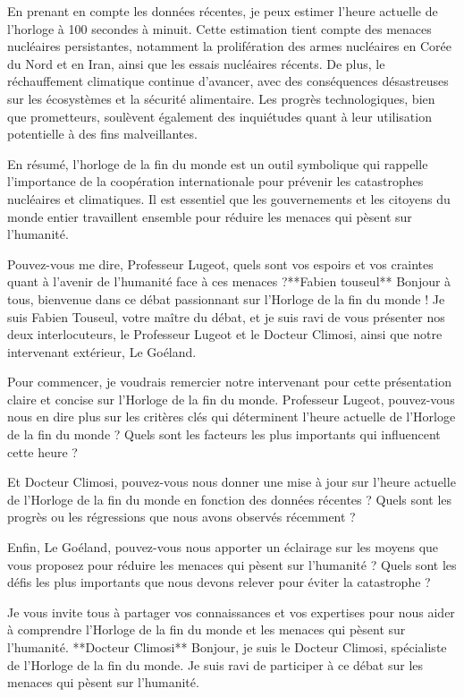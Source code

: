 En prenant en compte les données récentes, je peux estimer l'heure actuelle de l'horloge à 100 secondes à minuit. Cette estimation tient compte des menaces nucléaires persistantes, notamment la prolifération des armes nucléaires en Corée du Nord et en Iran, ainsi que les essais nucléaires récents. De plus, le réchauffement climatique continue d'avancer, avec des conséquences désastreuses sur les écosystèmes et la sécurité alimentaire. Les progrès technologiques, bien que prometteurs, soulèvent également des inquiétudes quant à leur utilisation potentielle à des fins malveillantes.

En résumé, l'horloge de la fin du monde est un outil symbolique qui rappelle l'importance de la coopération internationale pour prévenir les catastrophes nucléaires et climatiques. Il est essentiel que les gouvernements et les citoyens du monde entier travaillent ensemble pour réduire les menaces qui pèsent sur l'humanité.

Pouvez-vous me dire, Professeur Lugeot, quels sont vos espoirs et vos craintes quant à l'avenir de l'humanité face à ces menaces ?**Fabien touseul**
Bonjour à tous, bienvenue dans ce débat passionnant sur l'Horloge de la fin du monde ! Je suis Fabien Touseul, votre maître du débat, et je suis ravi de vous présenter nos deux interlocuteurs, le Professeur Lugeot et le Docteur Climosi, ainsi que notre intervenant extérieur, Le Goéland.

Pour commencer, je voudrais remercier notre intervenant pour cette présentation claire et concise sur l'Horloge de la fin du monde. Professeur Lugeot, pouvez-vous nous en dire plus sur les critères clés qui déterminent l'heure actuelle de l'Horloge de la fin du monde ? Quels sont les facteurs les plus importants qui influencent cette heure ?

Et Docteur Climosi, pouvez-vous nous donner une mise à jour sur l'heure actuelle de l'Horloge de la fin du monde en fonction des données récentes ? Quels sont les progrès ou les régressions que nous avons observés récemment ?

Enfin, Le Goéland, pouvez-vous nous apporter un éclairage sur les moyens que vous proposez pour réduire les menaces qui pèsent sur l'humanité ? Quels sont les défis les plus importants que nous devons relever pour éviter la catastrophe ?

Je vous invite tous à partager vos connaissances et vos expertises pour nous aider à comprendre l'Horloge de la fin du monde et les menaces qui pèsent sur l'humanité.
**Docteur Climosi**
Bonjour, je suis le Docteur Climosi, spécialiste de l'Horloge de la fin du monde. Je suis ravi de participer à ce débat sur les menaces qui pèsent sur l'humanité.

